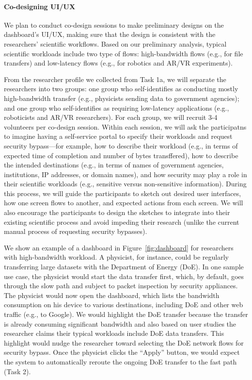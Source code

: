 \paragraph{Co-designing UI/UX}
We plan to conduct co-design sessions to make preliminary designs on the dashboard's UI/UX, making sure that the design is consistent with the researchers' scientific workflows.
Based on our preliminary analysis, typical scientific workloads include two type of flows: high-bandwidth flows (e.g., for file transfers) and low-latency flows (e.g., for robotics and AR/VR experiments).

From the researcher profile we collected from Task 1a, we will separate the researchers into two groups: one group who self-identifies as conducting mostly high-bandwidth transfer (e.g., physicists sending data to government agencies); and one group who self-identifies as requiring low-latency applications (e.g., roboticists and AR/VR researchers). For each group, we will recruit 3-4 volunteers per co-design session. Within each session, we will ask the participatns to imagine having a self-service portal to specify their workloads and request security bypass---for example, how to describe their workload (e.g., in terms of expected time of completion and number of bytes transffered), how to describe the intended destinations (e.g., in terms of names of government agencies, institutions, IP addresses, or domain names), and how security may play a role in their scientific workloads (e.g., sensitive versus non-sensitive information). During this process, we will guide the participants to sketch out desired user interfaces, how one screen flows to another, and expected actions from each screen.  We will also encourage the participants to design the sketches to integrate into their existing scientific process and avoid impeding their research (unlike the current manual process of requesting security bypasses).

We show an example of a dashboard in Figure~\ref{fig:dashboard} for researchers with high-bandwidth workload. A physicist, for instance, could be regularly transferring large datasets with the Department of Energy (DoE). In one sample use case, the physicist would start the data transfer first, which, by default, goes through the slow path and subject to packet inspection by security appliances. The physicist would now open the dashboard, which lists the bandwidth consumption on his device to various destinations, including DoE and other web traffic (e.g., to Google). We would highlight the DoE transfer because the transfer is already consuming significant bandwidth and also based on user studies the researcher claims their typical workloads include DoE data transfers. This highlight would nudge the researcher toward selecting the DoE network flows for security bypass. Once the physicist clicks the ``Apply'' button, we would expect the system to automatically reroute the ongoing DoE transfer to the fast path (Task 2).


